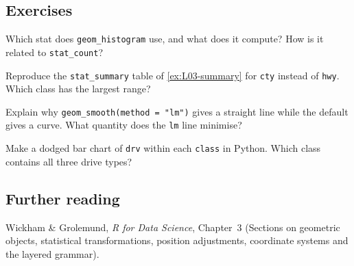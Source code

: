 \subsection{Exercises}
\begin{problem}\label{prob:L03-1}
Which stat does \texttt{geom\_histogram} use, and what does it compute? How is it related to \texttt{stat\_count}?
\end{problem}
\begin{problem}\label{prob:L03-2}
Reproduce the \texttt{stat\_summary} table of \cref{ex:L03-summary} for \texttt{cty} instead of \texttt{hwy}. Which class has the largest range?
\end{problem}
\begin{problem}\label{prob:L03-3}
Explain why \texttt{geom\_smooth(method = "lm")} gives a straight line while the default gives a curve. What quantity does the \texttt{lm} line minimise?
\end{problem}
\begin{problem}\label{prob:L03-4}
Make a dodged bar chart of \texttt{drv} within each \texttt{class} in Python. Which class contains all three drive types?
\end{problem}

\subsection{Further reading}
Wickham \& Grolemund, \emph{R for Data Science}, Chapter~3 (Sections on geometric objects,
statistical transformations, position adjustments, coordinate systems and the layered grammar).
